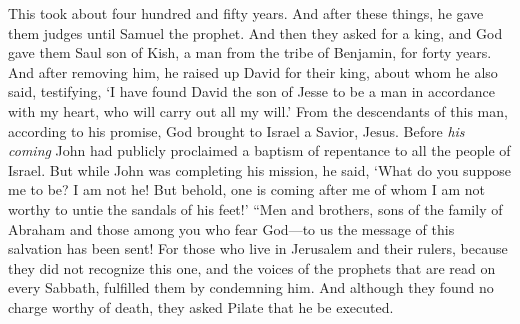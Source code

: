 \begin{biblechapter}
\verse This took about four hundred and fifty years. And after these things, he gave them judges until Samuel the prophet.
\verse And then they asked for a king, and God gave them Saul son of Kish, a man from the tribe of Benjamin, for forty years.
\verse And after removing him, he raised up David for their king, about whom he also said, testifying, ‘I have found David the son of Jesse to be a man in accordance with my heart, who will carry out all my will.’
\verse From the descendants of this man, according to his promise, God brought to Israel a Savior, Jesus.
\verse Before \textit{his coming} John had publicly proclaimed a baptism of repentance to all the people of Israel.
\verse But while John was completing his mission, he said, ‘What do you suppose me to be? I am not he! But behold, one is coming after me of whom I am not worthy to untie the sandals of his feet!’
\verse “Men and brothers, sons of the family of Abraham and those among you who fear God—to us the message of this salvation has been sent!
\verse For those who live in Jerusalem and their rulers, because they did not recognize this one, and the voices of the prophets that are read on every Sabbath, fulfilled them by condemning him.
\verse And although they found no charge worthy of death, they asked Pilate that he be executed.

\end{biblechapter}

